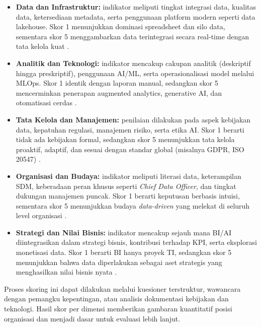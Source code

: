 \begin{itemize}
	\item \textbf{Data dan Infrastruktur:} indikator meliputi tingkat integrasi data, 
	kualitas data, ketersediaan metadata, serta penggunaan platform modern 
	seperti data lakehouse.  
	Skor 1 menunjukkan dominasi spreadsheet dan silo data, sementara skor 5 
	menggambarkan data terintegrasi secara real-time dengan tata kelola kuat 
	\cite{kimball2013, armbrust2021lakehouse}.
	
	\item \textbf{Analitik dan Teknologi:} indikator mencakup cakupan analitik 
	(deskriptif hingga preskriptif), penggunaan AI/ML, serta operasionalisasi model 
	melalui MLOps.  
	Skor 1 identik dengan laporan manual, sedangkan skor 5 mencerminkan 
	penerapan augmented analytics, generative AI, dan otomatisasi cerdas 
	\cite{chen2012, chen2021aibi}.
	
	\item \textbf{Tata Kelola dan Manajemen:} penilaian dilakukan pada aspek kebijakan data, 
	kepatuhan regulasi, manajemen risiko, serta etika AI.  
	Skor 1 berarti tidak ada kebijakan formal, sedangkan skor 5 menunjukkan tata kelola 
	proaktif, adaptif, dan sesuai dengan standar global (misalnya GDPR, ISO 20547) 
	\cite{sadiq2017, gdpr2021bigdata}.
	
	\item \textbf{Organisasi dan Budaya:} indikator meliputi literasi data, 
	keterampilan SDM, keberadaan peran khusus seperti \textit{Chief Data Officer}, 
	dan tingkat dukungan manajemen puncak.  
	Skor 1 berarti keputusan berbasis intuisi, sementara skor 5 menunjukkan 
	budaya \textit{data-driven} yang melekat di seluruh level organisasi 
	\cite{davenport2010analytics, lim2023adoption}.
	
	\item \textbf{Strategi dan Nilai Bisnis:} indikator mencakup sejauh mana BI/AI 
	diintegrasikan dalam strategi bisnis, kontribusi terhadap KPI, serta eksplorasi 
	monetisasi data.  
	Skor 1 berarti BI hanya proyek TI, sedangkan skor 5 menunjukkan bahwa 
	data diperlakukan sebagai aset strategis yang menghasilkan nilai bisnis nyata 
	\cite{labreuche2020, ekambaram2021}.
\end{itemize}

Proses skoring ini dapat dilakukan melalui kuesioner terstruktur, wawancara 
dengan pemangku kepentingan, atau analisis dokumentasi kebijakan dan teknologi. 
Hasil skor per dimensi memberikan gambaran kuantitatif posisi organisasi 
dan menjadi dasar untuk evaluasi lebih lanjut.

